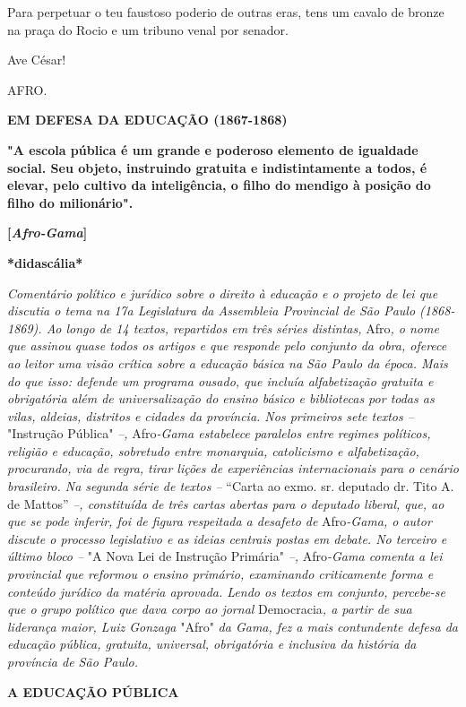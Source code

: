 Para perpetuar o teu faustoso poderio de outras eras, tens um cavalo de
bronze na praça do Rocio e um tribuno venal por senador.

Ave César!

AFRO.

\textbf{EM DEFESA DA EDUCAÇÃO (1867-1868)}

\textbf{"A escola pública é um grande e poderoso elemento de igualdade
social. Seu objeto, instruindo gratuita e indistintamente a todos, é
elevar, pelo cultivo da inteligência, o filho do mendigo à posição do
filho do milionário".}

\textbf{{[}\emph{Afro-Gama}{]}}

\textbf{*didascália*}

\emph{Comentário político e jurídico sobre o direito à educação e o
projeto de lei que discutia o tema na 17a Legislatura da Assembleia
Provincial de São Paulo (1868-1869). Ao longo de 14 textos, repartidos
em três séries distintas,} Afro\emph{, o nome que assinou quase todos os
artigos e que responde pelo conjunto da obra, oferece ao leitor uma
visão crítica sobre a educação básica na São Paulo da época. Mais do que
isso: defende um programa ousado, que incluía alfabetização gratuita e
obrigatória além de universalização do ensino básico e bibliotecas por
todas as vilas, aldeias, distritos e cidades da província. Nos primeiros
sete textos --} "Instrução Pública" \emph{--,} Afro\emph{-Gama
estabelece paralelos entre regimes políticos, religião e educação,
sobretudo entre monarquia, catolicismo e alfabetização, procurando, via
de regra, tirar lições de experiências internacionais para o cenário
brasileiro. Na segunda série de textos --} ``Carta ao exmo. sr. deputado
dr. Tito A. de Mattos'' \emph{--, constituída de três cartas abertas
para o deputado liberal, que, ao que se pode inferir, foi de figura
respeitada a desafeto de} Afro\emph{-Gama, o autor discute o processo
legislativo e as ideias centrais postas em debate. No terceiro e último
bloco --} "A Nova Lei de Instrução Primária" \emph{--,} Afro\emph{-Gama
comenta a lei provincial que reformou o ensino primário, examinando
criticamente forma e conteúdo jurídico da matéria aprovada. Lendo os
textos em conjunto, percebe-se que o grupo político que dava corpo ao
jornal} Democracia\emph{, a partir de sua liderança maior, Luiz Gonzaga}
"Afro" \emph{da Gama, fez a mais contundente defesa da educação pública,
gratuita, universal, obrigatória e inclusiva da história da província de
São Paulo.}

\textbf{A EDUCAÇÃO PÚBLICA}

